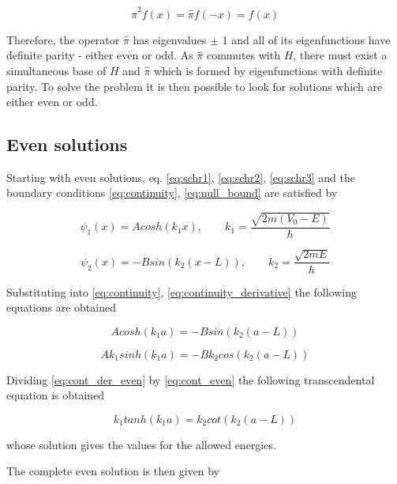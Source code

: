 \documentclass{article}
\begin{document}
\begin{equation}
\hat{\pi}^2f(x) = \hat{\pi}f(-x) = f(x)
\end{equation}

Therefore, the operator \(\hat{\pi}\) has eigenvalues \(\pm\) 1 and all of its eigenfunctions have definite parity - either even or odd. As \(\hat{\pi}\) commutes with \(H\), there must exist a simultaneous base of \(H\) and \(\hat{\pi}\) which is formed by eigenfunctions with definite parity. To solve the problem it is then possible to look for solutions which are either even or odd.

\subsection{Even solutions}
Starting with even solutions, eq. \eqref{eq:schr1}, \eqref{eq:schr2}, \eqref{eq:schr3} and the boundary conditions \eqref{eq:continuity}, \eqref{eq:null_bound} are satisfied by

\begin{equation}
\psi_{1}(x) = A cosh(k_{1} x), \qquad k_{1} = \frac{\sqrt{2m(V_{0} - E)}}{\hbar}
\end{equation}

\begin{equation}
\psi_{2}(x) = - B sin(k_{2}(x-L)), \qquad k_{2} = \frac{\sqrt{2mE}}{\hbar}
\end{equation}

Substituting into \eqref{eq:continuity}, \eqref{eq:continuity_derivative} the following equations are obtained

\begin{equation}
\label{eq:cont_even}
A cosh(k_{1}a) =  - B sin(k_{2}(a-L))
\end{equation}

\begin{equation}
\label{eq:cont_der_even}
A k_{1} sinh(k_{1}a) = - B k_{2} cos(k_{2}(a-L))
\end{equation}

Dividing \eqref{eq:cont_der_even} by \eqref{eq:cont_even} the following transcendental equation is obtained

\begin{equation}
\label{eq:trans_even}
k_{1} tanh(k_{1}a) = k_{2} cot(k_{2}(a-L))
\end{equation}

whose solution gives the values for the allowed energies.

The complete even solution is then given by
\end{document}
